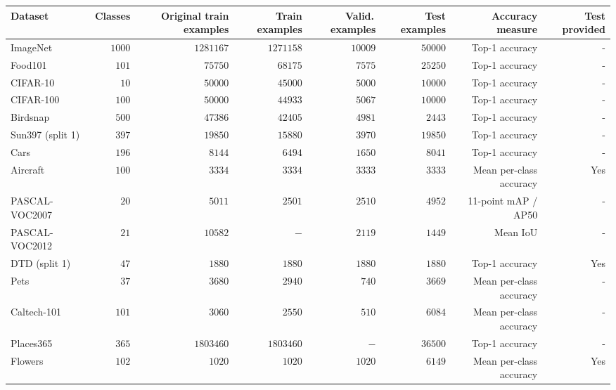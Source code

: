 \begin{tabular}{l r r r r r r r}
\toprule
Dataset & Classes & Original train examples & Train examples & Valid.\,examples & Test examples & Accuracy measure & Test provided\\
\midrule
ImageNet~\cite{ILSVRC15} &  $1000$ & $1281167$ & $1271158$ & $10009$ & $50000$ & Top-1 accuracy & -\\
Food101~\cite{food101}  &$101$ &$75750$ & $68175$ &$7575$ & $25250$ & Top-1 accuracy & - \\
CIFAR-10~\cite{cifar}  &$10$ &$50000$ & $45000$ & $5000$ &$10000$ & Top-1 accuracy & - \\
CIFAR-100~\cite{cifar} &$100$ &$50000$ & $44933$ & $5067$ &$10000$ & Top-1 accuracy & - \\
Birdsnap~\cite{Birdsnap} & $500$ & $47386$ & $42405$ &  $4981$ & $2443$ & Top-1 accuracy & - \\
Sun397 (split 1)~\cite{sun397}  &$397$ &$19850$ & $15880$ &$3970$ &$19850$ & Top-1 accuracy & - \\
Cars~\cite{carsdataset} & $196$ & $8144$ & $6494$ & $1650$ & $8041$ & Top-1 accuracy & - \\
Aircraft~\cite{aircraft} & $100$ & $3334$ & $3334$ & $3333$ & $3333$ & Mean per-class accuracy & Yes \\
PASCAL-VOC2007 ~\cite{pascal} &$20$ &$5011$ & $2501$ &$2510$ &$4952$ & 11-point mAP / AP50 & - \\
PASCAL-VOC2012 ~\cite{pascal} &$21$ &$10582$ & $-$ &$2119$ &$1449$ & Mean IoU & - \\
DTD (split 1) ~\cite{dtd} & $47$ & $1880$ & $1880$ & $1880$ & $1880$ & Top-1 accuracy & Yes \\
Pets~\cite{pets} & $37$ & $3680$ & $2940$ & $740$ & $3669$ & Mean per-class accuracy& - \\
Caltech-101~\cite{caltech101} & $101$ & $3060$ & $2550$ & $510$ & $6084$ & Mean per-class accuracy & - \\
Places365~\cite{zhou2017places} & $365$ & $1803460$ & $1803460$ & $-$ & $36500$ & Top-1 accuracy & - \\
Flowers~\cite{flowers} &$102$ & $1020$ & $1020$ & $1020$ & $6149$ & Mean per-class accuracy & Yes \\
\bottomrule
\end{tabular}